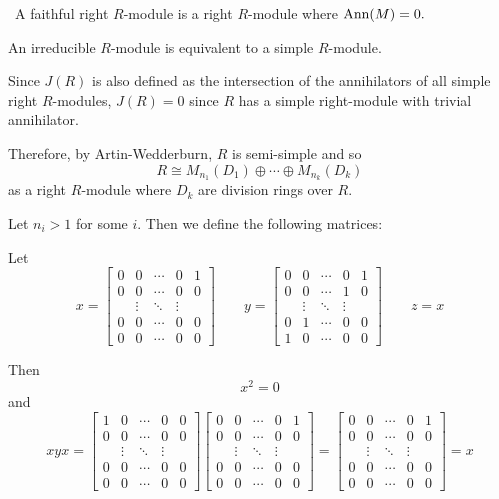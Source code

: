 \documentclass[12pt]{AlgebraQual}
\begin{document}
\begin{solution}$\,$
A faithful right $R$-module is a right $R$-module where $\text{Ann}(M)=0.$

An irreducible $R$-module is equivalent to a simple $R$-module.

Since $J(R)$ is also defined as the intersection of the annihilators of all simple right $R$-modules, $J(R)=0$ since $R$ has a simple right-module with trivial annihilator.

Therefore, by Artin-Wedderburn, $R$ is semi-simple and so $$R\cong M_{n_1}(D_1)\oplus\cdots\oplus M_{n_k}(D_k)$$ as a right $R$-module where $D_k$ are division rings over $R.$

Let $n_i>1$ for some $i$. Then we define the following matrices:

Let $$x=\begin{bmatrix}
    0 & 0 & \cdots & 0 & 1\\
    0 & 0 & \cdots & 0 & 0\\
    & \vdots & \ddots & \vdots &\\
    0 & 0 & \cdots & 0 & 0\\
    0 & 0 & \cdots & 0 & 0
    \end{bmatrix} \qquad y=\begin{bmatrix}
    0 & 0 & \cdots & 0 & 1\\
    0 & 0 & \cdots & 1 & 0\\
    & \vdots & \ddots & \vdots &\\
    0 & 1 & \cdots & 0 & 0\\
    1 & 0 & \cdots & 0 & 0
    \end{bmatrix}\qquad z=x $$

    Then $$x^2=0$$ and $$xyx=\begin{bmatrix}
    1 & 0 & \cdots & 0 & 0\\
    0 & 0 & \cdots & 0 & 0\\
    & \vdots & \ddots & \vdots &\\
    0 & 0 & \cdots & 0 & 0\\
    0 & 0 & \cdots & 0 & 0
    \end{bmatrix}\begin{bmatrix}
    0 & 0 & \cdots & 0 & 1\\
    0 & 0 & \cdots & 0 & 0\\
    & \vdots & \ddots & \vdots &\\
    0 & 0 & \cdots & 0 & 0\\
    0 & 0 & \cdots & 0 & 0
    \end{bmatrix}=\begin{bmatrix}
    0 & 0 & \cdots & 0 & 1\\
    0 & 0 & \cdots & 0 & 0\\
    & \vdots & \ddots & \vdots &\\
    0 & 0 & \cdots & 0 & 0\\
    0 & 0 & \cdots & 0 & 0
    \end{bmatrix}=x$$


\end{solution}
\end{document}
